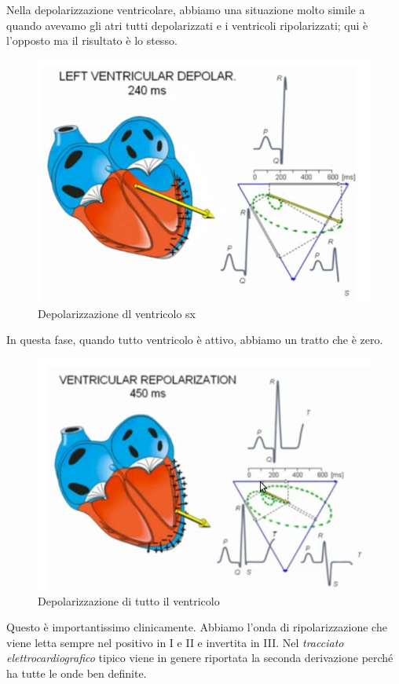 \documentclass[a4paper,12pt]{article}
\begin{document}
Nella depolarizzazione ventricolare, abbiamo una situazione molto simile a quando avevamo gli atri tutti depolarizzati e i ventricoli ripolarizzati; qui è l'opposto ma il risultato è lo stesso.
\begin{figure}[H]
\centering
\includegraphics[scale=0.4]{immagine/sedici.jpg}
\caption{Depolarizzazione dl ventricolo sx}
\end{figure}
In questa fase, quando tutto ventricolo è attivo, abbiamo un tratto che è zero. 
\begin{figure}[H]
\centering
\includegraphics[scale=0.4]{immagine/diciannove.jpg}
\caption{Depolarizzazione di tutto il ventricolo}
\end{figure}

Questo è importantissimo clinicamente. Abbiamo l'onda di ripolarizzazione che viene letta sempre nel positivo in I e II e invertita in III. Nel \emph{tracciato elettrocardiografico} tipico viene in genere riportata la seconda derivazione perché ha tutte le onde ben definite.
\end{document}
